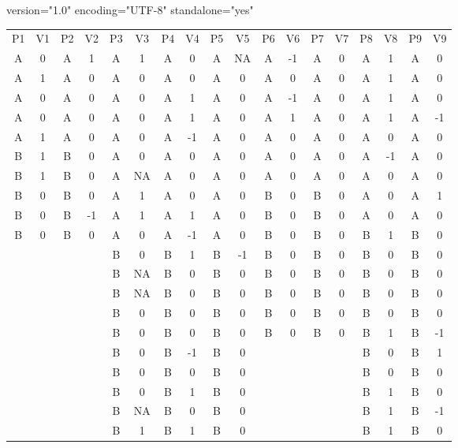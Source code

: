 version="1.0" encoding="UTF-8" standalone="yes" \documentclass{article}
\begin{document}
  \begin{table}

  
  \begin{tabular}{c  c  c  c  c  c  c  c  c  c  c  c  c  c  c  c  c  c}

  P1 & V1 & P2 & V2 & P3 & V3 & P4 & V4 & P5 & V5 & P6 & V6 & P7 & V7 & P8 & V8 & P9 & V9\\
A & 0 & A & 1 & A & 1 & A & 0 & A & NA & A & -1 & A & 0 & A & 1 & A & 0\\
A & 1 & A & 0 & A & 0 & A & 0 & A & 0 & A & 0 & A & 0 & A & 1 & A & 0\\
A & 0 & A & 0 & A & 0 & A & 1 & A & 0 & A & -1 & A & 0 & A & 1 & A & 0\\
A & 0 & A & 0 & A & 0 & A & 1 & A & 0 & A & 1 & A & 0 & A & 1 & A & -1\\
A & 1 & A & 0 & A & 0 & A & -1 & A & 0 & A & 0 & A & 0 & A & 0 & A & 0\\
B & 1 & B & 0 & A & 0 & A & 0 & A & 0 & A & 0 & A & 0 & A & -1 & A & 0\\
B & 1 & B & 0 & A & NA & A & 0 & A & 0 & A & 0 & A & 0 & A & 0 & A & 0\\
B & 0 & B & 0 & A & 1 & A & 0 & A & 0 & B & 0 & B & 0 & A & 0 & A & 1\\
B & 0 & B & -1 & A & 1 & A & 1 & A & 0 & B & 0 & B & 0 & A & 0 & A & 0\\
B & 0 & B & 0 & A & 0 & A & -1 & A & 0 & B & 0 & B & 0 & B & 1 & B & 0\\
  &   &   &   & B & 0 & B & 1 & B & -1 & B & 0 & B & 0 & B & 0 & B & 0\\
  &   &   &   & B & NA & B & 0 & B & 0 & B & 0 & B & 0 & B & 0 & B & 0\\
  &   &   &   & B & NA & B & 0 & B & 0 & B & 0 & B & 0 & B & 0 & B & 0\\
  &   &   &   & B & 0 & B & 0 & B & 0 & B & 0 & B & 0 & B & 0 & B & 0\\
  &   &   &   & B & 0 & B & 0 & B & 0 & B & 0 & B & 0 & B & 1 & B & -1\\
  &   &   &   & B & 0 & B & -1 & B & 0 &   &   &   &   & B & 0 & B & 1\\
  &   &   &   & B & 0 & B & 0 & B & 0 &   &   &   &   & B & 0 & B & 0\\
  &   &   &   & B & 0 & B & 1 & B & 0 &   &   &   &   & B & 1 & B & 0\\
  &   &   &   & B & NA & B & 0 & B & 0 &   &   &   &   & B & 1 & B & -1\\
  &   &   &   & B & 1 & B & 1 & B & 0 &   &   &   &   & B & 1 & B & 0\\

\end{tabular}
\end{table}
\end{document}
